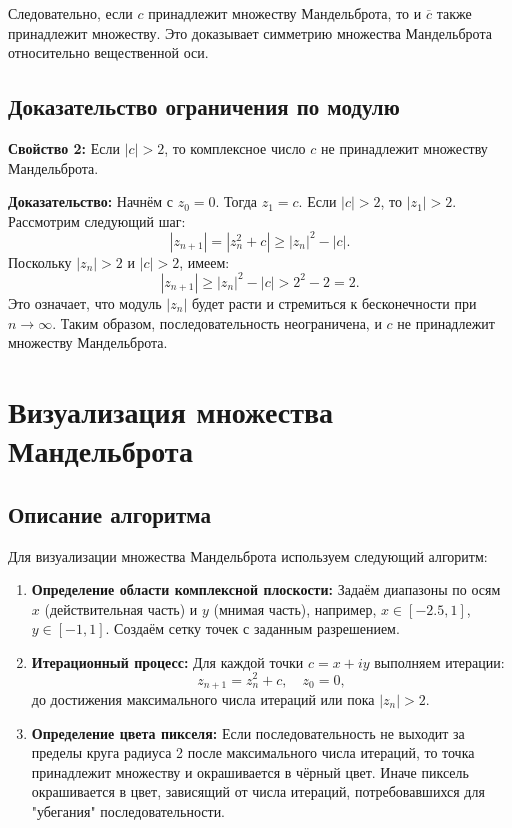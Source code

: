 \documentclass{article}
\begin{document}
	Следовательно, если $c$ принадлежит множеству Мандельброта, то и $\overline{c}$ также принадлежит множеству. Это доказывает симметрию множества Мандельброта относительно вещественной оси.
	
	\subsection{Доказательство ограничения по модулю}
	\textbf{Свойство 2:} Если $|c| > 2$, то комплексное число $c$ не принадлежит множеству Мандельброта.
	
	\textbf{Доказательство:}
	Начнём с $z_0 = 0$. Тогда $z_1 = c$. Если $|c| > 2$, то $|z_1| > 2$. Рассмотрим следующий шаг:
	\begin{equation}
		|z_{n+1}| = |z_n^2 + c| \geq |z_n|^2 - |c|.
	\end{equation}
	Поскольку $|z_n| > 2$ и $|c| > 2$, имеем:
	\begin{equation}
		|z_{n+1}| \geq |z_n|^2 - |c| > 2^2 - 2 = 2.
	\end{equation}
	Это означает, что модуль $|z_n|$ будет расти и стремиться к бесконечности при $n \to \infty$. Таким образом, последовательность неограничена, и $c$ не принадлежит множеству Мандельброта.
	
	\newpage
	
	\section{Визуализация множества Мандельброта}
	
	\subsection{Описание алгоритма}
	Для визуализации множества Мандельброта используем следующий алгоритм:
	
	\begin{enumerate}
		\item \textbf{Определение области комплексной плоскости:} Задаём диапазоны по осям $x$ (действительная часть) и $y$ (мнимая часть), например, $x \in [-2.5, 1]$, $y \in [-1, 1]$. Создаём сетку точек с заданным разрешением.
		\item \textbf{Итерационный процесс:} Для каждой точки $c = x + iy$ выполняем итерации:
		\begin{equation}
			z_{n+1} = z_n^2 + c, \quad z_0 = 0,
		\end{equation}
		до достижения максимального числа итераций или пока $|z_n| > 2$.
		\item \textbf{Определение цвета пикселя:} Если последовательность не выходит за пределы круга радиуса 2 после максимального числа итераций, то точка принадлежит множеству и окрашивается в чёрный цвет. Иначе пиксель окрашивается в цвет, зависящий от числа итераций, потребовавшихся для "убегания" последовательности.
	\end{enumerate}
	
\end{document}
